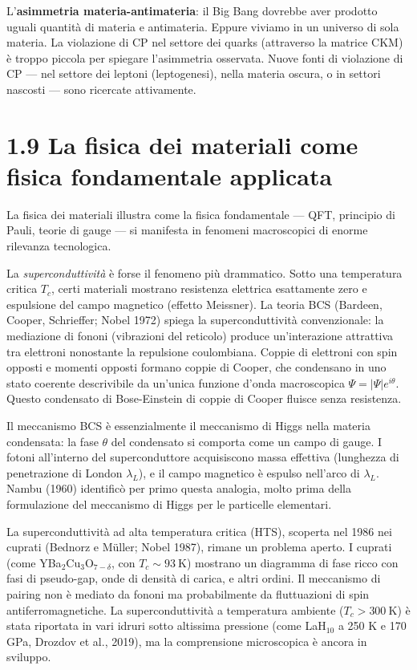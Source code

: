 \documentclass[11.5pt,a4paper,openany]{book}
\theoremstyle{remark}
\begin{document}
L'\textbf{asimmetria materia-antimateria}: il Big Bang dovrebbe aver prodotto uguali quantità di materia e antimateria. Eppure viviamo in un universo di sola materia. La violazione di CP nel settore dei quarks (attraverso la matrice CKM) è troppo piccola per spiegare l'asimmetria osservata. Nuove fonti di violazione di CP --- nel settore dei leptoni (leptogenesi), nella materia oscura, o in settori nascosti --- sono ricercate attivamente.

\section{1.9 La fisica dei materiali come fisica fondamentale applicata}

La fisica dei materiali illustra come la fisica fondamentale --- QFT, principio di Pauli, teorie di gauge --- si manifesta in fenomeni macroscopici di enorme rilevanza tecnologica.

La \textit{superconduttività} è forse il fenomeno più drammatico. Sotto una temperatura critica $T_c$, certi materiali mostrano resistenza elettrica esattamente zero e espulsione del campo magnetico (effetto Meissner). La teoria BCS (Bardeen, Cooper, Schrieffer; Nobel 1972) spiega la superconduttività convenzionale: la mediazione di fononi (vibrazioni del reticolo) produce un'interazione attrattiva tra elettroni nonostante la repulsione coulombiana. Coppie di elettroni con spin opposti e momenti opposti formano coppie di Cooper, che condensano in uno stato coerente descrivibile da un'unica funzione d'onda macroscopica $\Psi = |\Psi|e^{i\theta}$. Questo condensato di Bose-Einstein di coppie di Cooper fluisce senza resistenza.

Il meccanismo BCS è essenzialmente il meccanismo di Higgs nella materia condensata: la fase $\theta$ del condensato si comporta come un campo di gauge. I fotoni all'interno del superconduttore acquisiscono massa effettiva (lunghezza di penetrazione di London $\lambda_L$), e il campo magnetico è espulso nell'arco di $\lambda_L$. Nambu (1960) identificò per primo questa analogia, molto prima della formulazione del meccanismo di Higgs per le particelle elementari.

La superconduttività ad alta temperatura critica (HTS), scoperta nel 1986 nei cuprati (Bednorz e Müller; Nobel 1987), rimane un problema aperto. I cuprati (come YBa$_2$Cu$_3$O$_{7-\delta}$, con $T_c \sim 93\ \text{K}$) mostrano un diagramma di fase ricco con fasi di pseudo-gap, onde di densità di carica, e altri ordini. Il meccanismo di pairing non è mediato da fononi ma probabilmente da fluttuazioni di spin antiferromagnetiche. La superconduttività a temperatura ambiente ($T_c > 300\ \text{K}$) è stata riportata in vari idruri sotto altissima pressione (come LaH$_{10}$ a 250 K e 170 GPa, Drozdov et al., 2019), ma la comprensione microscopica è ancora in sviluppo.
\end{document}

